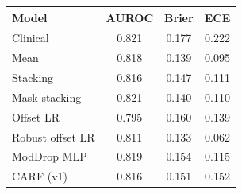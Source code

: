 \begin{tabular}{lccc}
\toprule
Model & AUROC & Brier & ECE \\
\midrule
Clinical & 0.821 & 0.177 & 0.222 \\
Mean & 0.818 & 0.139 & 0.095 \\
Stacking & 0.816 & 0.147 & 0.111 \\
Mask-stacking & 0.821 & 0.140 & 0.110 \\
Offset LR & 0.795 & 0.160 & 0.139 \\
Robust offset LR & 0.811 & 0.133 & 0.062 \\
ModDrop MLP & 0.819 & 0.154 & 0.115 \\
CARF (v1) & 0.816 & 0.151 & 0.152 \\
\bottomrule
\end{tabular}
